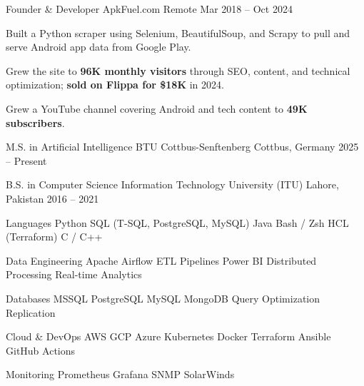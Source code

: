 \documentclass[11pt, a4paper]{awesome-cv}
\begin{document}
\begin{cventries}
  \cventry
    {Founder \& Developer}
    {ApkFuel.com}
    {Remote}
    {Mar 2018 -- Oct 2024}
    {
      \begin{cvitems}
        \item {Built a Python scraper using Selenium, BeautifulSoup, and Scrapy to pull and serve Android app data from Google Play.}
        \item {Grew the site to \textbf{96K monthly visitors} through SEO, content, and technical optimization; \textbf{sold on Flippa for \$18K} in 2024.}
        \item {Grew a YouTube channel covering Android and tech content to \textbf{49K subscribers}.}
      \end{cvitems}
    }

\end{cventries}



\begin{cventries}

  \cventry
    {M.S. in Artificial Intelligence}
    {BTU Cottbus-Senftenberg}
    {Cottbus, Germany}
    {2025 -- Present}
    {}

  \cventry
    {B.S. in Computer Science}
    {Information Technology University (ITU)}
    {Lahore, Pakistan}
    {2016 -- 2021}
    {}

\end{cventries}



\begin{cvskills}

  \cvskill
    {Languages}
    {Python \textbullet{} SQL (T-SQL, PostgreSQL, MySQL) \textbullet{} Java \textbullet{} Bash / Zsh \textbullet{} HCL (Terraform) \textbullet{} C / C++}

  \cvskill
    {Data Engineering}
    {Apache Airflow \textbullet{} ETL Pipelines \textbullet{} Power BI \textbullet{} Distributed Processing \textbullet{} Real-time Analytics}

  \cvskill
    {Databases}
    {MSSQL \textbullet{} PostgreSQL \textbullet{} MySQL \textbullet{} MongoDB \textbullet{} Query Optimization \textbullet{} Replication}

  \cvskill
    {Cloud \& DevOps}
    {AWS \textbullet{} GCP \textbullet{} Azure \textbullet{} Kubernetes \textbullet{} Docker \textbullet{} Terraform \textbullet{} Ansible \textbullet{} GitHub Actions}

  \cvskill
    {Monitoring}
    {Prometheus \textbullet{} Grafana \textbullet{} SNMP \textbullet{} SolarWinds}

\end{cvskills}
\end{document}

